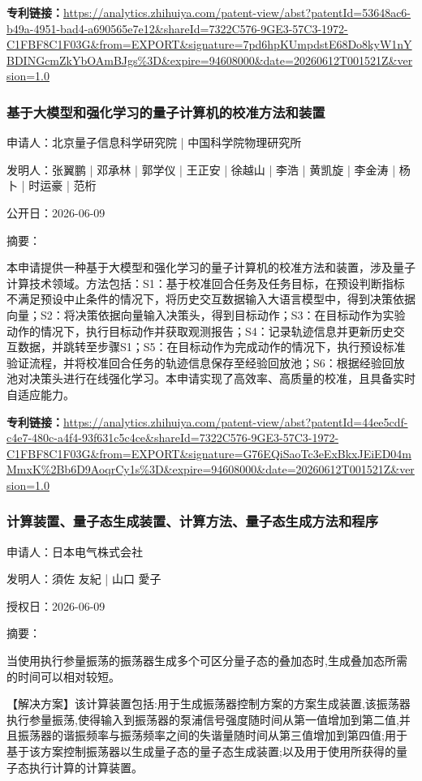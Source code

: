 \documentclass[12pt,a4paper]{ctexart}
\begin{document}
\noindent\textbf{专利链接：}\url{https://analytics.zhihuiya.com/patent-view/abst?patentId=53648ac6-b49a-4951-bad4-a690565e7e12&shareId=7322C576-9GE3-57C3-1972-C1FBF8C1F03G&from=EXPORT&signature=7pd6hpKUmpdstE68Do8kyW1nYBDINGcmZkYbOAmBJgs%3D&expire=94608000&date=20260612T001521Z&version=1.0}

\subsubsection{ 基于大模型和强化学习的量子计算机的校准方法和装置 }

申请人：北京量子信息科学研究院 | 中国科学院物理研究所

发明人：张翼鹏 | 邓承林 | 郭学仪 | 王正安 | 徐越山 | 李浩 | 黄凯旋 | 李金涛 | 杨卜 | 时运豪 | 范桁

公开日：2026-06-09

摘要：

本申请提供一种基于大模型和强化学习的量子计算机的校准方法和装置，涉及量子计算技术领域。方法包括：S1：基于校准回合任务及任务目标，在预设判断指标不满足预设中止条件的情况下，将历史交互数据输入大语言模型中，得到决策依据向量；S2：将决策依据向量输入决策头，得到目标动作；S3：在目标动作为实验动作的情况下，执行目标动作并获取观测报告；S4：记录轨迹信息并更新历史交互数据，并跳转至步骤S1；S5：在目标动作为完成动作的情况下，执行预设标准验证流程，并将校准回合任务的轨迹信息保存至经验回放池；S6：根据经验回放池对决策头进行在线强化学习。本申请实现了高效率、高质量的校准，且具备实时自适应能力。

\noindent\textbf{专利链接：}\url{https://analytics.zhihuiya.com/patent-view/abst?patentId=44ee5cdf-c4e7-480c-a4f4-93f631c5c4ce&shareId=7322C576-9GE3-57C3-1972-C1FBF8C1F03G&from=EXPORT&signature=G76EQiSaoTc3eExBkxJEiED04mMmxK%2Bb6D9AoqrCy1s%3D&expire=94608000&date=20260612T001521Z&version=1.0}

\subsubsection{ 计算装置、量子态生成装置、计算方法、量子态生成方法和程序 }

申请人：日本电气株式会社

发明人：須佐 友紀 | 山口 愛子

授权日：2026-06-09

摘要：

当使用执行参量振荡的振荡器生成多个可区分量子态的叠加态时,生成叠加态所需的时间可以相对较短。 

 【解决方案】该计算装置包括:用于生成振荡器控制方案的方案生成装置,该振荡器执行参量振荡,使得输入到振荡器的泵浦信号强度随时间从第一值增加到第二值,并且振荡器的谐振频率与振荡频率之间的失谐量随时间从第三值增加到第四值;用于基于该方案控制振荡器以生成量子态的量子态生成装置;以及用于使用所获得的量子态执行计算的计算装置。
\end{document}
